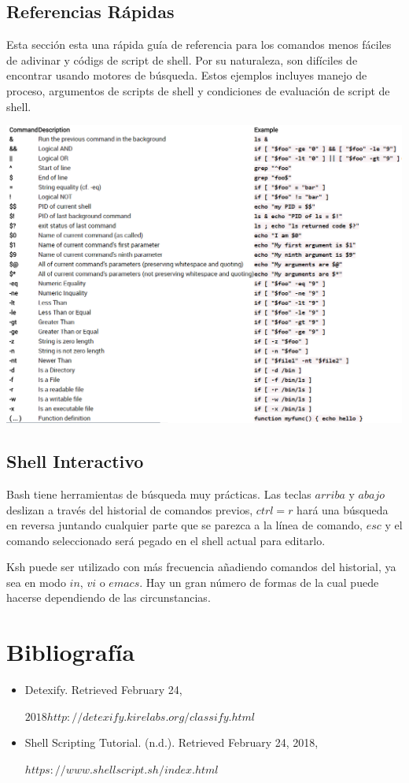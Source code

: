 \documentclass{article}
\begin{document}
\subsection{Referencias Rápidas}
Esta sección esta una rápida guía de referencia para los comandos menos fáciles de adivinar y códigs de script de shell. Por su naturaleza, son difíciles de encontrar usando motores de búsqueda. Estos ejemplos incluyes manejo de proceso, argumentos de scripts de shell y condiciones de evaluación de script de shell.

	\begin{center}
    \includegraphics[height=10cm]{comandos.png}
    \end{center}
    
\subsection{Shell Interactivo}
Bash tiene herramientas de búsqueda muy prácticas. Las teclas $arriba$ y $abajo$ deslizan a través del historial de comandos previos, $ctrl=r$ hará una búsqueda en reversa juntando cualquier parte que se parezca a la línea de comando, $esc$ y el comando seleccionado será pegado en el shell actual para editarlo.

Ksh puede ser utilizado con más frecuencia añadiendo comandos del historial, ya sea en modo $in$, $vi$ o $emacs$. Hay un gran número de formas de la cual puede hacerse dependiendo de las circunstancias.

\section{Bibliografía}
\begin{itemize}
\item Detexify. Retrieved February 24,

$2018 http://detexify.kirelabs.org/classify.html$

\item Shell Scripting Tutorial. (n.d.). Retrieved February 24, 2018,

$https://www.shellscript.sh/index.html$

\end{itemize}
\end{document}
